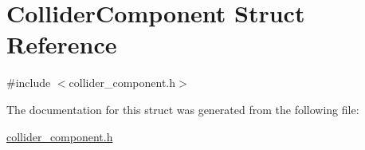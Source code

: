 \hypertarget{structColliderComponent}{\section{Collider\-Component Struct Reference}
\label{structColliderComponent}
}


{\ttfamily \#include $<$collider\-\_\-component.\-h$>$}



The documentation for this struct was generated from the following file\-:\begin{DoxyCompactItemize}
\item 
\hyperlink{collider__component_8h}{collider\-\_\-component.\-h}\end{DoxyCompactItemize}
